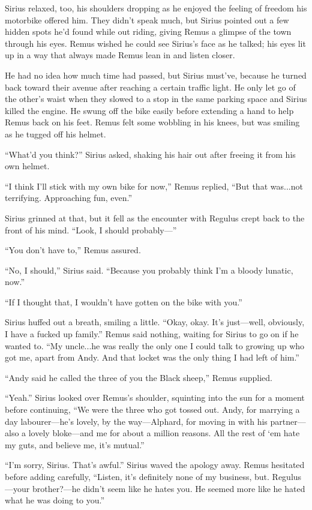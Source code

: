 Sirius relaxed, too, his shoulders dropping as he enjoyed the feeling of freedom his motorbike offered him. They didn’t speak much, but Sirius pointed out a few hidden spots he’d found while out riding, giving Remus a glimpse of the town through his eyes. Remus wished he could see Sirius’s face as he talked; his eyes lit up in a way that always made Remus lean in and listen closer.

He had no idea how much time had passed, but Sirius must’ve, because he turned back toward their avenue after reaching a certain traffic light. He only let go of the other’s waist when they slowed to a stop in the same parking space and Sirius killed the engine. He swung off the bike easily before extending a hand to help Remus back on his feet. Remus felt some wobbling in his knees, but was smiling as he tugged off his helmet.

“What’d you think?” Sirius asked, shaking his hair out after freeing it from his own helmet.

“I think I’ll stick with my own bike for now,” Remus replied, “But that was...not terrifying. Approaching fun, even.”

Sirius grinned at that, but it fell as the encounter with Regulus crept back to the front of his mind. “Look, I should probably—”

“You don’t have to,” Remus assured.

“No, I should,” Sirius said. “Because you probably think I’m a bloody lunatic, now.”

“If I thought that, I wouldn’t have gotten on the bike with you.”

Sirius huffed out a breath, smiling a little. “Okay, okay. It’s just—well, obviously, I have a fucked up family.” Remus said nothing, waiting for Sirius to go on if he wanted to. “My uncle...he was really the only one I could talk to growing up who got me, apart from Andy. And that locket was the only thing I had left of him.”

“Andy said he called the three of you the Black sheep,” Remus supplied.

“Yeah.” Sirius looked over Remus’s shoulder, squinting into the sun for a moment before continuing, “We were the three who got tossed out. Andy, for marrying a day labourer—he’s lovely, by the way—Alphard, for moving in with his partner—also a lovely bloke—and me for about a million reasons. All the rest of ‘em hate my guts, and believe me, it’s mutual.”

“I’m sorry, Sirius. That’s awful.” Sirius waved the apology away. Remus hesitated before adding carefully, “Listen, it’s definitely none of my business, but. Regulus—your brother?—he didn’t seem like he hates you. He seemed more like he hated what he was doing to you.”

